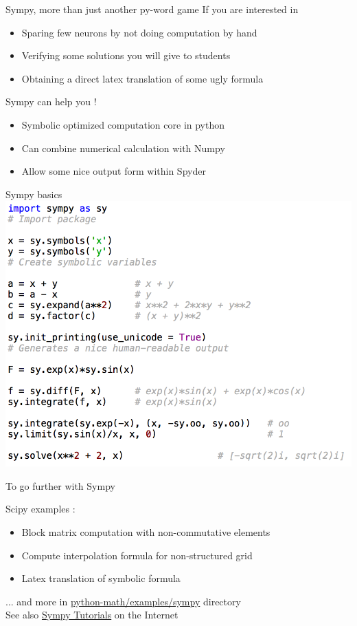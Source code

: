 \documentclass[11pt,unknownkeysallowed,usenames,dvipsnames]{beamer}
\begin{document}
\begin{frame}{Sympy, more than just another py-word game}
    If you are interested in
    \begin{itemize}
        \item Sparing few neurons by not doing computation by hand
        \item Verifying some solutions you will give to students
        \item Obtaining a direct latex translation of some ugly formula 
    \end{itemize}
    \begin{center}
        Sympy can help you !
    \end{center}
    \begin{itemize}
        \item Symbolic optimized computation core in python
        \item Can combine numerical calculation with Numpy
        \item Allow some nice output form within Spyder
    \end{itemize}
\end{frame}

\begin{frame}{Sympy basics}
	\includegraphics[width=0.9\linewidth]{code-sympy}
\end{frame}

\begin{frame}{To go further with Sympy}
	\begin{block}{Scipy examples :}
        \begin{itemize}
            \item Block matrix computation with non-commutative elements
            \item Compute interpolation formula for non-structured grid
            \item Latex translation of symbolic formula
        \end{itemize}
    \end{block}
    \vspace*{-7pt}
    ... and more in    
    \href{https://gitlab.unige.ch/Thibaut.Lunet/python-math/tree/master/examples/sympy}{python-math/examples/sympy} directory \\
    See also \href{http://docs.sympy.org/latest/tutorial/index.html}{Sympy Tutorials} on the Internet
\end{frame}
\end{document}
